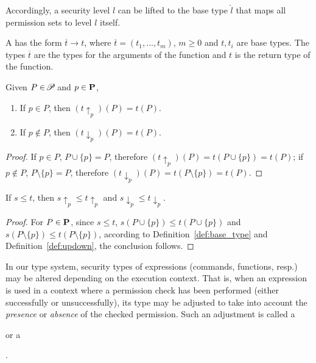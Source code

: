 {Accordingly, a security level $l$ can be lifted to the base type $\hat{l}$ that maps all permission sets to level $l$ itself.



 \begin{definition}\label{def:fun-type}
   A  has the form $\overline{t} \rightarrow t$, where $\overline{t}=(t_1,\ldots,t_m)$, $m\geq 0$ and $t, t_i$ are base types.
   The types $\overline t$ are the types for the arguments of the function and $t$ is the return type of the function.
 \end{definition}

\begin{lemma}\label{lem:promote-demote}
Given $P\in\!\mathscr{P}\!$ and $p\in\mathbf{P}$,
\begin{enumerate}[label*={(\alph*)}]
  \item\label{lem:promote-demote-1} If $p \in P$, then $(t\uparrow_{p})(P) = t(P)$.
	\item\label{lem:promote-demote-2} If $p \notin P$, then $(t\downarrow_{p})(P) = t(P)$.
\end{enumerate}
\end{lemma}
 \begin{proof}
If $p\in P$, $P\cup\{p\}=P$, therefore $(t\uparrow_{p}) (P) = t(P\cup \{p\})=t(P)$; if $p\notin P$, $P\setminus\{p\}=P$, therefore $(t\downarrow_{p}) (P) = t(P\setminus\{p\})=t(P)$.
 \end{proof}

\begin{lemma}\label{lem:pd-order}
If $s\leq t$, then $s\uparrow_{p} \leq t\uparrow_{p}$ and $s\downarrow_{p} \leq t\downarrow_{p}$.
\end{lemma}
 \begin{proof}
For $P\in\mathbf{P}$, since $s\leq t$, $s(P\cup\{p\})\leq t(P\cup\{p\})$ and $s(P\setminus\{p\})\leq t(P\setminus\{p\})$, according to Definition~\ref{def:base_type} and Definition~\ref{def:updown}, the conclusion follows.
 \end{proof}


In our type system, security types of  expressions (commands, functions, resp.) may be
altered depending on the execution context. That is, when an expression is used in
a context where a permission check has been performed (either successfully or unsuccessfully),
its type may be adjusted to take into account the \emph{presence} or \emph{absence}
of the checked permission.
Such an adjustment is called a { or a {.


}}}
